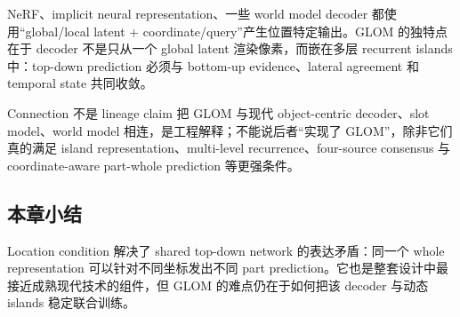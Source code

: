 NeRF、implicit neural representation、一些 world model decoder 都使用“global/local latent + coordinate/query”产生位置特定输出。GLOM 的独特点在于 decoder 不是只从一个 global latent 渲染像素，而嵌在多层 recurrent islands 中：top-down prediction 必须与 bottom-up evidence、lateral agreement 和 temporal state 共同收敛。

\begin{warningbox}{Connection 不是 lineage claim}
把 GLOM 与现代 object-centric decoder、slot model、world model 相连，是工程解释；不能说后者“实现了 GLOM”，除非它们真的满足 island representation、multi-level recurrence、four-source consensus 与 coordinate-aware part-whole prediction 等更强条件。
\end{warningbox}

\subsection{本章小结}

Location condition 解决了 shared top-down network 的表达矛盾：同一个 whole representation 可以针对不同坐标发出不同 part prediction。它也是整套设计中最接近成熟现代技术的组件，但 GLOM 的难点仍在于如何把该 decoder 与动态 islands 稳定联合训练。

